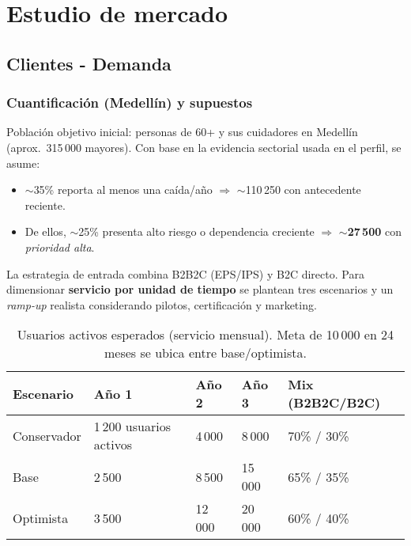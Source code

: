 \section{Estudio de mercado}

\subsection{Clientes - Demanda}

\subsubsection{Cuantificación (Medellín) y supuestos}
Población objetivo inicial: personas de 60+ y sus cuidadores en Medellín (aprox.\ 315\,000 mayores). Con base en la evidencia sectorial usada en el perfil, se asume: 
\begin{itemize}
    \item $\sim$35\% reporta al menos una caída/año $\Rightarrow$ $\sim$110\,250 con antecedente reciente.
    \item De ellos, $\sim$25\% presenta alto riesgo o dependencia creciente $\Rightarrow$ \textbf{$\sim$27\,500} con \emph{prioridad alta}.
\end{itemize}
La estrategia de entrada combina B2B2C (EPS/IPS) y B2C directo. Para dimensionar \textbf{servicio por unidad de tiempo} se plantean tres escenarios y un \emph{ramp-up} realista considerando pilotos, certificación y marketing.

\begin{table}[H]
\centering
\renewcommand{\arraystretch}{1.15}
\begin{tabular}{p{3.3cm} p{2.3cm} p{2.3cm} p{2.3cm} p{2.8cm}}
\toprule
\textbf{Escenario} & \textbf{Año 1} & \textbf{Año 2} & \textbf{Año 3} & \textbf{Mix (B2B2C/B2C)}\\
\midrule
Conservador & 1\,200 usuarios activos & 4\,000 & 8\,000 & 70\% / 30\% \\
Base & 2\,500 & 8\,500 & 15\,000 & 65\% / 35\% \\
Optimista & 3\,500 & 12\,000 & 20\,000 & 60\% / 40\% \\
\bottomrule
\end{tabular}
\caption{Usuarios activos esperados (servicio mensual). Meta de 10\,000 en 24 meses se ubica entre base/optimista.}
\end{table}

